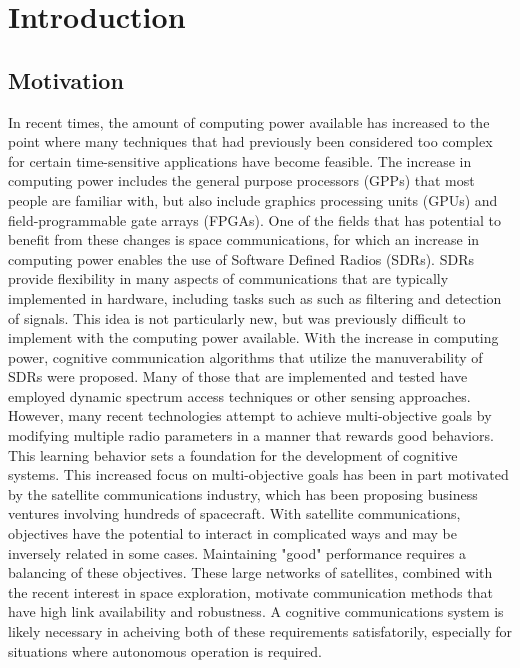\chapter{Introduction}
\section{Motivation}
\par In recent times, the amount of computing power available has increased to the point where many techniques that had previously been considered too complex for certain time-sensitive applications have become feasible. The increase in computing power includes the general purpose processors (GPPs) that most people are familiar with, but also include graphics processing units (GPUs) and field-programmable gate arrays (FPGAs). One of the fields that has potential to benefit from these changes is space communications, for which an increase in computing power enables the use of Software Defined Radios (SDRs)\cite{tim1, tim2}. SDRs provide flexibility in many aspects of communications that are typically implemented in hardware, including tasks such as such as filtering and detection of signals\cite[p.~xxxiii]{SDRTextbook}. This idea is not particularly new, but was previously difficult to implement with the computing power available. With the increase in computing power, cognitive communication algorithms that utilize the manuverability of SDRs were proposed. Many of those that are implemented and tested have employed dynamic spectrum access techniques or other sensing approaches. However, many recent technologies attempt to achieve multi-objective goals by modifying multiple radio parameters in a manner that rewards good behaviors. This learning behavior sets a foundation for the development of cognitive systems. This increased focus on multi-objective goals has been in part motivated by the satellite communications industry, which has been proposing business ventures involving hundreds of spacecraft. With satellite communications, objectives have the potential to interact in complicated ways and may be inversely related in some cases. Maintaining "good" performance requires a balancing of these objectives. These large networks of satellites, combined with the recent interest in space exploration, motivate communication methods that have high link availability and robustness\cite{paulo6}. A cognitive communications system is likely necessary in acheiving both of these requirements satisfatorily, especially for situations where autonomous operation is required.

